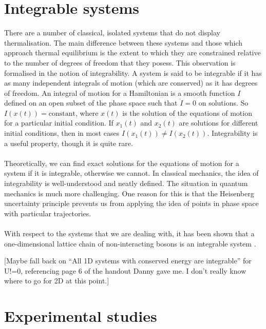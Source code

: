 \documentclass[a4paper,10pt]{article}
\begin{document}
\section{Integrable systems}
There are a number of classical, isolated systems that do not display thermalisation. The main difference between these systems and those which approach thermal equilibrium is the extent to which
they are constrained relative to the number of degrees of freedom that they posess. This observation is formalised in the notion of integrability. A system is said to be integrable if it has  as 
many independent integrals of motion (which are conserved) as it has degrees of freedom. An integral of motion for a Hamiltonian is a smooth function $I$ defined on an open subset of the 
phase space such that $\dot{I}=0$ on solutions. So $I(x(t))=\text{constant}$, where $x(t)$ is the solution of the equations of motion
for a particular initial condition. If $x_1(t)$ and $x_2(t)$ are solutions for different initial conditions, then in most cases $I(x_1(t))\ne I(x_2(t))$.
Integrability is a useful property, though it is quite rare. \\\\

Theoretically, we can find exact solutions for the equations of motion for a system if it is integrable, otherwise we cannot. 
In classical mechanics, the idea of integrability is well-understood and neatly defined. The situation in quantum mechanics is much more challenging. One reason for this is that 
the Heisenberg uncertainty principle prevents us from applying the idea of points in phase space with particular trajectories. 
\\\\
With respect to the systems that we are dealing with, it has been shown that a one-dimensional lattice chain of non-interacting bosons is an integrable system \cite{Rigol2007}. 



 [Maybe fall back on ``All 1D systems with conserved energy are integrable'' for U!=0, referencing page 6 of the handout Danny gave me. I don't really know where 
to go for 2D at this point.]

\newpage
\section{Experimental studies}
\end{document}

